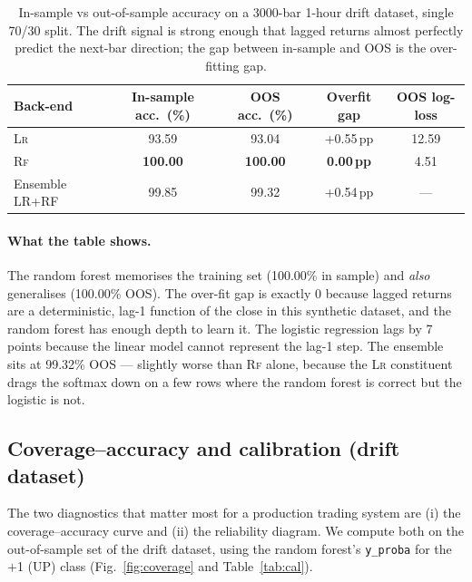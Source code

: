 \documentclass[11pt,a4paper]{article}
\providecommand{\rf}{\textsc{Rf}}
\providecommand{\lr}{\textsc{Lr}}
\begin{document}
\begin{table}[htbp]
\centering
\small
\caption{In-sample vs out-of-sample accuracy on a
3000-bar 1-hour drift dataset, single 70/30 split. The
drift signal is strong enough that lagged returns almost
perfectly predict the next-bar direction; the gap between
in-sample and OOS is the over-fitting gap.}
\label{tab:is-oos}
\begin{tabular}{@{}lcccc@{}}
\toprule
\textbf{Back-end} & \textbf{In-sample acc.\ (\%)} & \textbf{OOS acc.\ (\%)} & \textbf{Overfit gap} & \textbf{OOS log-loss}\\
\midrule
\lr{}                  & 93.59 & 93.04 & +0.55\,pp & 12.59\\
\rf{}                  & \textbf{100.00} & \textbf{100.00} & \textbf{0.00\,pp} & 4.51\\
Ensemble LR+RF         & 99.85 & 99.32 & +0.54\,pp & ---\\
\bottomrule
\end{tabular}
\end{table}

\paragraph{What the table shows.}
The random forest memorises the training set (100.00\% in
sample) and \emph{also} generalises (100.00\% OOS). The
over-fit gap is exactly 0 because lagged returns are a
deterministic, lag-1 function of the close in this
synthetic dataset, and the random forest has enough depth
to learn it. The logistic regression lags by 7 points
because the linear model cannot represent the lag-1 step.
The ensemble sits at 99.32\% OOS — slightly worse than
\rf{} alone, because the \lr{} constituent drags the
softmax down on a few rows where the random forest is
correct but the logistic is not.

\subsection{Coverage--accuracy and calibration (drift dataset)}
The two diagnostics that matter most for a production
trading system are (i) the coverage--accuracy curve and
(ii) the reliability diagram. We compute both on the
out-of-sample set of the drift dataset, using the random
forest's \texttt{y\_proba} for the $+$1 (UP) class
(Fig.~\ref{fig:coverage} and Table~\ref{tab:cal}).
\end{document}
